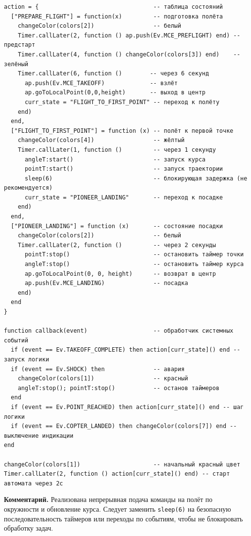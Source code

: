 \begin{verbatim}
action = {                                 -- таблица состояний
  ["PREPARE_FLIGHT"] = function(x)         -- подготовка полёта
    changeColor(colors[2])                 -- белый
    Timer.callLater(2, function () ap.push(Ev.MCE_PREFLIGHT) end) -- предстарт
    Timer.callLater(4, function () changeColor(colors[3]) end)    -- зелёный
    Timer.callLater(6, function ()        -- через 6 секунд
      ap.push(Ev.MCE_TAKEOFF)             -- взлёт
      ap.goToLocalPoint(0,0,height)       -- выход в центр
      curr_state = "FLIGHT_TO_FIRST_POINT" -- переход к полёту
    end)
  end,
  ["FLIGHT_TO_FIRST_POINT"] = function (x) -- полёт к первой точке
    changeColor(colors[4])                 -- жёлтый
    Timer.callLater(1, function ()         -- через 1 секунду
      angleT:start()                       -- запуск курса
      pointT:start()                       -- запуск траектории
      sleep(6)                             -- блокирующая задержка (не рекомендуется)
      curr_state = "PIONEER_LANDING"       -- переход к посадке
    end)
  end,
  ["PIONEER_LANDING"] = function (x)       -- состояние посадки
    changeColor(colors[2])                 -- белый
    Timer.callLater(2, function ()         -- через 2 секунды
      pointT:stop()                        -- остановить таймер точки
      angleT:stop()                        -- остановить таймер курса
      ap.goToLocalPoint(0, 0, height)      -- возврат в центр
      ap.push(Ev.MCE_LANDING)              -- посадка
    end)
  end
}

function callback(event)                   -- обработчик системных событий
  if (event == Ev.TAKEOFF_COMPLETE) then action[curr_state]() end -- запуск логики
  if (event == Ev.SHOCK) then              -- авария
    changeColor(colors[1])                 -- красный
    angleT:stop(); pointT:stop()           -- останов таймеров
  end
  if (event == Ev.POINT_REACHED) then action[curr_state]() end -- шаг логики
  if (event == Ev.COPTER_LANDED) then changeColor(colors[7]) end -- выключение индикации
end

changeColor(colors[1])                     -- начальный красный цвет
Timer.callLater(2, function () action[curr_state]() end) -- старт автомата через 2с
\end{verbatim}
\textbf{Комментарий.} Реализована непрерывная подача команды на полёт по окружности и обновление курса. Следует заменить \texttt{sleep(6)} на безопасную последовательность таймеров или переходы по событиям, чтобы не блокировать обработку задач.

